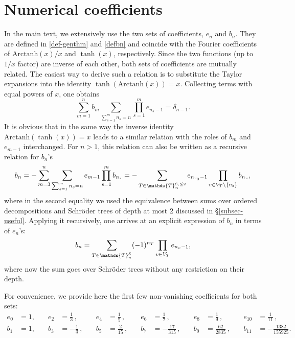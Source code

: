 \documentclass[12pt,letterpaper]{JHEP3}
\def\be{\begin{equation}}
\def\ee{\end{equation}}
\newcommand{\IT}{\mathds{T}}
\begin{document}
\section{Numerical coefficients}
\label{ap-coef}

In the main text, we extensively use the two sets of coefficients, $e_n$ and $b_n$.
They are defined in \eqref{def-genthm} and \eqref{defbn} and coincide with the Fourier coefficients 
of $\mbox{Arctanh}(x)/x$ and $\tanh(x)$, respectively.
Since the two functions (up to $1/x$ factor) are inverse of each other, both sets of coefficients are mutually related.
The easiest way to derive such a relation is to substitute the Taylor expansions into the identity
$\tanh(\mbox{Arctanh}(x))=x$. Collecting terms with equal powers of $x$, one obtains 
\be
\sum_{m= 1}^{n}b_m\sum_{\sum_{s=1}^{m}n_s=n}
\prod_{s=1}^{m} e_{n_s-1}=\delta_{n-1}.
\label{ident-be}
\ee 
It is obvious that in the same way the inverse identity $\mbox{Arctanh}(\tanh(x))=x$ leads to a similar relation with the roles of 
$b_m$ and $e_{m-1}$ interchanged.
For $n>1$, this relation can also be written as a recursive relation for $b_n$'s
\be
b_n=-\sum_{m=3}^n\sum_{\sum_{s=1}^m n_s=n}e_{m-1} \prod_{s=1}^m b_{n_s}
=-\sum_{T\in \IT^{\rm S,\leq 2}_n} 
e_{n_{v_0}-1}\prod_{v\in V_T\setminus\{v_0\}}b_{n_v},
\label{b-eb}
\ee 
where in the second equality we used the equivalence between sums over ordered decompositions and Schr\"oder trees of depth at most 2
discussed in \S\ref{subsec-useful}. Applying it recursively, one arrives at an explicit expression of $b_n$ in terms of $e_n$'s:
\be
b_n=\sum_{T\in \IT_{n}^{\rm S}}(-1)^{n_T} \prod_{v\in V_T} e_{n_{v}-1} , 
\label{expr-bn}
\ee 
where now the sum goes over Schr\"oder trees without any restriction on their depth. 

For convenience, we provide here the first few non-vanishing coefficients for both sets:
\be
\begin{array}{rlrlrlrlrlrl}
	e_0&=1, &\quad e_2&=\frac13\, , &\quad e_4&=\frac15\, , &\quad  e_6&=\frac17\, , &\quad e_8&=\frac19\, , &\quad e_{10}&=\frac{1}{11}\, ,
	\\
	b_1&=1, &\quad b_3&=-\frac13\, , &\quad b_5&=\frac{2}{15}\, , &\quad  b_7&=-\frac{17}{315}\, , &\quad b_9&=\frac{62}{2835}\, ,
	&\quad b_{11}&=-\frac{1382}{155925}.
\end{array}
\ee 

\medskip 
\end{document}
